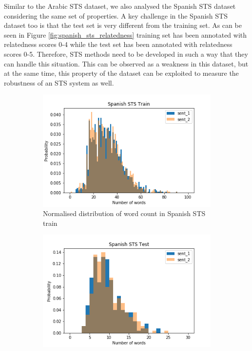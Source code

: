 \begin{enumerate}
Similar to the Arabic STS dataset, we also analysed the Spanish STS dataset considering the same set of properties. A key challenge in the Spanish STS dataset too is that the test set is very different from the training set. As can be seen in Figure \ref{fig:spanish_sts_relatedness} training set has been annotated with relatedness scores 0-4 while the test set has been annotated with relatedness scores 0-5. Therefore, STS methods need to be developed in such a way that they can handle this situation. This can be observed as a weakness in this dataset, but at the same time, this property of the dataset can be exploited to measure the robustness of an STS system as well.

\begin{figure}
	\captionsetup[subfigure]{justification=centering}
	\centering
	\begin{subfigure}[b]{.5\textwidth}
		\centering
		\includegraphics[width=\textwidth]{figures/semantic_textual_similarity/introduction/spanish_sts_train_words.png}
		\caption{Normalised distribution of word count in Spanish STS train}
		\label{fig:spanish_sts_train_words}
	\end{subfigure}%
	\begin{subfigure}[b]{.5\textwidth}
		\centering
		\includegraphics[width=\textwidth]{figures/semantic_textual_similarity/introduction/spanish_sts_test_words.png}

\end{subfigure}
\end{figure}
\end{enumerate}
